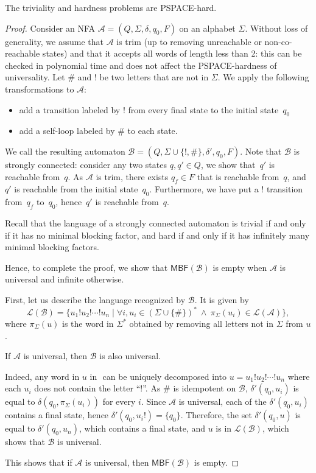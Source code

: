 \documentclass[letterpaper, USenglish, cleveref, autoref, thm-restate, numberwithinsect]{lipics-v2021}
\theoremstyle{theorem}
\theoremstyle{definition}
\newcommand{\Aa}{\mathcal{A}}
\newcommand{\Bb}{\mathcal{B}}
\newcommand{\lang}[1]{\mathcal{L}(#1)}
\newcommand{\MBF}{\textsf{MBF}\xspace}
\newcommand{\PSPACE}{\textsf{PSPACE}\xspace}
\newcommand{\set}[1]{\{ #1 \}}
\begin{document}
\begin{lemma}\label{lemma:trivial-complexity}
	The triviality and hardness problems are \PSPACE-hard.
\end{lemma}
\begin{proof}
	Consider an NFA $\Aa = (Q, \Sigma, \delta, q_0, F)$ on an alphabet $\Sigma$.
	Without loss of generality, we assume that $\Aa$ is trim (up to removing unreachable or non-co-reachable states) and that it accepts all words of length less than 2: this can be checked in polynomial time and does not affect the \PSPACE-hardness of universality.
	Let $\#$ and $!$ be two letters that are not in $\Sigma$.
	We apply the following transformations to $\Aa$:
	\begin{itemize}
		\item add a transition labeled by $!$ from every final state to the initial state~$q_0$
		\item add a self-loop labeled by $\#$ to each state.
	\end{itemize}
	
	We call the resulting automaton $\Bb = (Q, \Sigma\cup\set{!,\#}, \delta', q_0, F)$.
	Note that $\Bb$ is strongly connected:
	consider any two states $q, q' \in Q$, we show that~$q'$ is reachable from~$q$. As $\Aa$ is trim, there exists $q_f \in F$ that is reachable from~$q$, and~$q'$ is reachable from the initial state~$q_0$.
	Furthermore, we have put a $!$ transition from~$q_f$ to~$q_0$, hence~$q'$ is reachable from~$q$.
	
	Recall that the language of a strongly connected automaton is trivial if and only if it has no minimal blocking factor, and hard if and only if it has infinitely many minimal blocking factors.
	
	Hence, to complete the proof, we show that $\MBF(\Bb)$ is empty when $\Aa$ is universal and infinite otherwise. 
	
	First, let us describe the language recognized by $\Bb$. It is given by
	\[\lang{\Bb} = \set{u_1!u_2!\cdots !u_n \mid \forall i, u_i \in (\Sigma\cup\set{\#})^* ~\land~ \pi_{\Sigma}(u_i) \in \lang{\Aa}},\]
	where $\pi_{\Sigma}(u)$ is the word in $\Sigma^*$ obtained by removing all letters not in $\Sigma$ from $u$.
	
	\begin{claim}
		If $\Aa$ is universal, then $\Bb$ is also universal. 
	\end{claim}
	\begin{claimproof}
		Indeed, any word in $u$ in $ $ can be uniquely decomposed into $u = u_1!u_2!\cdots !u_n$ where each $u_i$ does not contain the letter ``$!$''.
		As $\#$ is idempotent on $\Bb$, $\delta'(q_0,u_i)$ is equal to $\delta(q_0, \pi_{\Sigma}(u_i))$ for every $i$.
		Since $\Aa$ is universal, each of the $\delta'(q_0, u_i)$ contains a final state, hence $\delta'(q_0, u_i!) = \set{q_0}$.
		Therefore, the set $\delta'(q_0, u)$ is equal to $\delta'(q_0, u_n)$, which contains a final state, and  $u$ is in $\lang{\Bb}$, which shows that $\Bb$ is universal.
	\end{claimproof}
	This shows that if $\Aa$ is universal, then $\MBF(\Bb)$ is empty.
	

\end{proof}
\end{document}
